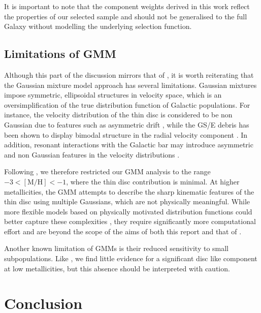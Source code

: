 \documentclass[a4paper,12pt]{article}
\begin{document}
It is important to note that the component weights derived in this work reflect the properties of our 
selected sample and should not be generalised to the full Galaxy without modelling the underlying 
selection function.


\subsection{Limitations of GMM}

Although this part of the discussion mirrors that of \citet{zhang2024existencemetalpoordiscmilky}, 
it is worth reiterating that the Gaussian mixture model approach has several limitations. 
Gaussian mixtures impose symmetric, ellipsoidal structures in velocity space, 
which is an oversimplification of the true distribution function of Galactic populations. 
For instance, the velocity distribution of the thin disc is considered to be non Gaussian 
due to features such as asymmetric drift \citep{Li2024ass}, while the GS/E debris has been shown to display bimodal 
structure in the radial velocity component \citep{Lancaster2019,Necib2019}. 
In addition, resonant interactions with the Galactic bar may introduce asymmetric and non Gaussian 
features in the velocity distributions \citep[e.g.][]{Dillamore2023}. 

Following \citet{zhang2024existencemetalpoordiscmilky}, we therefore restricted our GMM analysis 
to the range $-3 < \mathrm{[M/H]} < -1$, where the thin disc contribution is minimal. At higher 
metallicities, the GMM attempts to describe the sharp kinematic features of the thin disc using 
multiple Gaussians, which are not physically meaningful. While more flexible models based on 
physically motivated distribution functions could better capture these complexities 
\citep[e.g.][]{Binney2010}, they require significantly more computational effort and are 
beyond the scope of the aims of both this report and that of \citet{zhang2024existencemetalpoordiscmilky}.

Another known limitation of GMMs is their reduced sensitivity to small subpopulations. 
Like \citet{zhang2024existencemetalpoordiscmilky}, we find little evidence for a significant 
disc like component at low metallicities, but this absence should be interpreted with caution. 

\section{Conclusion}
\end{document}
